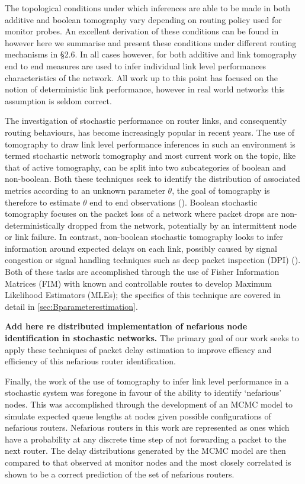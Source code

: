 The topological conditions under which inferences are able to be made in both additive and boolean tomography vary depending on routing policy used for monitor probes. An excellent derivation of these conditions can be found in \cite{he_network_2021} however here we summarise and present these conditions under different routing mechanisms in §2.6. In all cases however, for both additive and link tomography end to end measures are used to infer individual link level performances characteristics of the network. All work up to this point has focused on the notion of deterministic link performance, however in real world networks this assumption is seldom correct.\par
The investigation of stochastic performance on router links, and consequently routing behaviours, has become increasingly popular in recent years. The use of tomography to draw link level performance inferences in such an environment is termed stochastic network tomography and most current work on the topic, like that of active tomography, can be split into two subcategories of boolean and non-boolean. Both these techniques seek to identify the distribution of associated metrics according to an unknown parameter $\theta$, the goal of tomography is therefore to estimate $\theta$ end to end observations (\cite{he_fisher_2015}). Boolean stochastic tomography focuses on the packet loss of a network where packet drops are non-deterministically dropped from the network, potentially by an intermittent node or link failure. In contrast, non-boolean stochastic tomography looks to infer information around expected delays on each link, possibly caused by signal congestion or signal handling techniques such as deep packet inspection (DPI) (\cite{el-maghraby_survey_2017}). Both of these tasks are accomplished through the use of Fisher Information Matrices (FIM) with known and controllable routes to develop Maximum Likelihood Estimators (MLEs); the specifics of this technique are covered in detail in \cref{sec:Bparameterestimation}.\par
\textbf{Add \cite{kolar_distributed_2020} here re distributed implementation of nefarious node identification in stochastic networks.}
The primary goal of our work seeks to apply these techniques of packet delay estimation to improve efficacy and efficiency of this nefarious router identification.\par
Finally, the work of \cite{barnes_stochastic_2020} the use of tomography to infer link level performance in a stochastic system was foregone in favour of the ability to identify ‘nefarious’ nodes. This was accomplished through the development of an MCMC model to simulate expected queue lengths at nodes given possible configurations of nefarious routers. Nefarious routers in this work are represented as ones which have a probability at any discrete time step of not forwarding a packet to the next router. The delay distributions generated by the MCMC model are then compared to that observed at monitor nodes and the most closely correlated is shown to be a correct prediction of the set of nefarious routers. 
